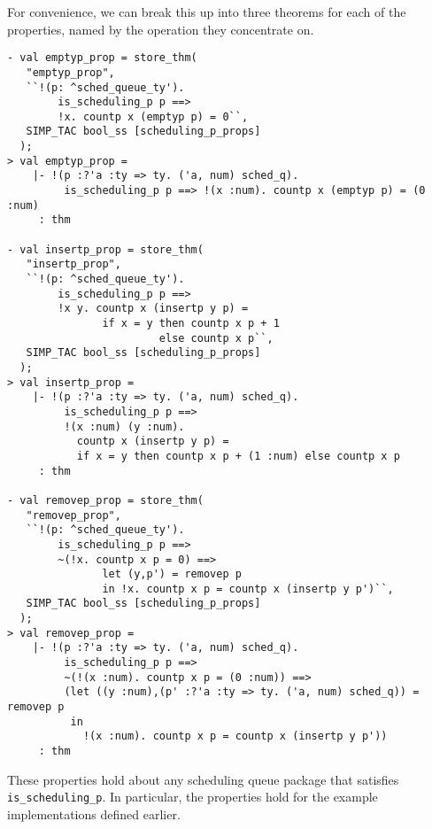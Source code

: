 For convenience, we can break this up into three theorems for each of the
properties, named by the operation they concentrate on.
\begin{session}
\begin{verbatim}
- val emptyp_prop = store_thm(
   "emptyp_prop",
   ``!(p: ^sched_queue_ty').
        is_scheduling_p p ==>
        !x. countp x (emptyp p) = 0``,
   SIMP_TAC bool_ss [scheduling_p_props]
  );
> val emptyp_prop =
    |- !(p :?'a :ty => ty. ('a, num) sched_q).
         is_scheduling_p p ==> !(x :num). countp x (emptyp p) = (0 :num)
     : thm

- val insertp_prop = store_thm(
   "insertp_prop",
   ``!(p: ^sched_queue_ty').
        is_scheduling_p p ==>
        !x y. countp x (insertp y p) =
               if x = y then countp x p + 1
                        else countp x p``,
   SIMP_TAC bool_ss [scheduling_p_props]
  );
> val insertp_prop =
    |- !(p :?'a :ty => ty. ('a, num) sched_q).
         is_scheduling_p p ==>
         !(x :num) (y :num).
           countp x (insertp y p) =
           if x = y then countp x p + (1 :num) else countp x p
     : thm

- val removep_prop = store_thm(
   "removep_prop",
   ``!(p: ^sched_queue_ty').
        is_scheduling_p p ==>
        ~(!x. countp x p = 0) ==>
               let (y,p') = removep p
               in !x. countp x p = countp x (insertp y p')``,
   SIMP_TAC bool_ss [scheduling_p_props]
  );
> val removep_prop =
    |- !(p :?'a :ty => ty. ('a, num) sched_q).
         is_scheduling_p p ==>
         ~(!(x :num). countp x p = (0 :num)) ==>
         (let ((y :num),(p' :?'a :ty => ty. ('a, num) sched_q)) = removep p
          in
            !(x :num). countp x p = countp x (insertp y p'))
     : thm
\end{verbatim}
\end{session}
These properties hold about any scheduling queue package
that satisfies {\tt is\_scheduling\_p}.
In particular, the properties hold for the example implementations
defined earlier.

